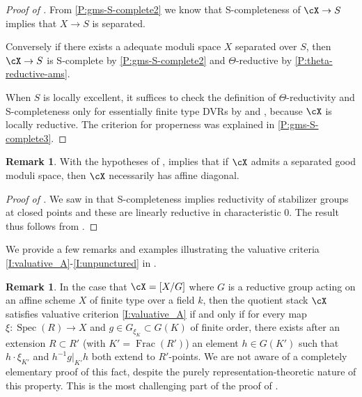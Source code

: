 \documentclass[a4paper]{amsart}
\numberwithin{equation}{section}
\theoremstyle{plain}
\theoremstyle{definition}
\newtheorem{remark}[thm]{Remark}
\DeclareMathOperator{\Spec}{Spec}
\DeclareMathOperator{\Frac}{Frac}
\newcommand{\co}{\colon}
\def\Scomplete{\textsf{S}-complete}
\begin{document}
\begin{proof}[Proof of ]
From \eqref{P:gms-S-complete2} we know that \textsf{S}-completeness of $\cX \to S$ implies that $X \to S$ is separated. 

Conversely if there exists a adequate moduli space $X$ separated over $S$, then $\cX \to S$ is \textsf{S}-complete by \eqref{P:gms-S-complete2} and $\Theta$-reductive by \eqref{P:theta-reductive-ams}.

When $S$ is locally excellent, it suffices to check the definition of $\Theta$-reductivity and {\textsf{S}}-completeness only for essentially finite type DVRs by  and , because $\cX$ is locally reductive. The criterion for properness was explained in \eqref{P:gms-S-complete3}.
\end{proof}

\begin{remark}
With the hypotheses of , \cite[Cor.~13.11]{ahr2} implies that if $\cX$ admits a separated good moduli space, then $\cX$ necessarily has affine diagonal.
\end{remark}

\begin{proof}[Proof of ] We saw in  that \Scomplete ness implies reductivity of stabilizer groups at closed points and these are linearly reductive in characteristic $0$. The result thus follows from .
\end{proof}







We provide a few remarks and examples illustrating the valuative criteria \eqref{I:valuative_A}-\eqref{I:unpunctured} in .

\begin{remark}
In the case that $\cX=[X/G]$ where $G$ is a reductive group acting on an affine scheme $X$ of finite type over a field $k$, then the quotient stack $\cX$ satisfies valuative criterion \eqref{I:valuative_A} if and only if for every map $\xi \co \Spec(R) \to X$ and $g \in G_{\xi_K} \subset G(K)$ of finite order, there exists after an extension $R \subset R'$  (with $K' = \Frac(R')$) an element $h \in G(K')$ such that $h \cdot \xi_{K'}$ and $h^{-1}g|_{K'}h$ both extend to $R'$-points. We are not aware of a completely elementary proof of this fact, despite the purely representation-theoretic nature of this property. This is the most challenging part of the proof of .
\end{remark}
\end{document}
